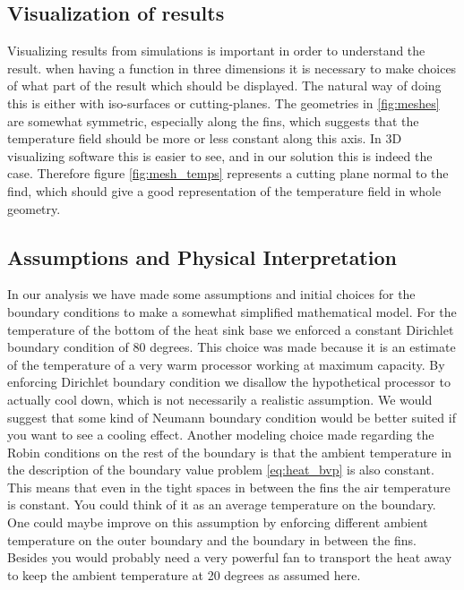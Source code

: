 \subsection{Visualization of results}
Visualizing results from simulations is important in order to understand the result. when having a function in three dimensions it is necessary to make choices of what part of the result which should be displayed. The natural way of doing this is either with iso-surfaces or cutting-planes. The geometries in \ref{fig:meshes} are somewhat symmetric, especially along the fins, which suggests that the temperature field should be more or less constant along this axis. In 3D visualizing software this is easier to see, and in our solution this is indeed the case. Therefore figure \ref{fig:mesh_temps} represents a cutting plane normal to the find, which should give a good representation of the temperature field in whole geometry.

\subsection{Assumptions and Physical Interpretation}
In our analysis we have made some assumptions and initial choices for the boundary conditions to make a somewhat simplified mathematical model. For the temperature of the bottom of the heat sink base we enforced a constant Dirichlet boundary condition of 80 degrees. This choice was made because it is an estimate of the temperature of a very warm processor working at maximum capacity. By enforcing Dirichlet boundary condition we disallow the hypothetical processor to actually cool down, which is not necessarily a realistic assumption. We would suggest that some kind of Neumann boundary condition would be better suited if you want to see a cooling effect. Another modeling choice made regarding the Robin conditions on the rest of the boundary is that the ambient temperature in the description of the boundary value problem \eqref{eq:heat_bvp} is also constant. This means that even in the tight spaces in between the fins the air temperature is constant. You could think of it as an average temperature on the boundary. One could maybe improve on this assumption by enforcing different ambient temperature on the outer boundary and the boundary in between the fins. Besides you would probably need a very powerful fan to transport the heat away to keep the ambient temperature at 20 degrees as assumed here. 
